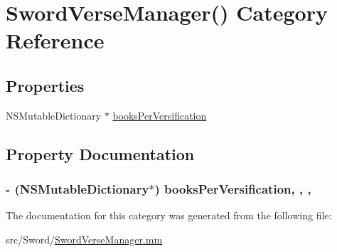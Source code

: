 \hypertarget{category_sword_verse_manager_07_08}{\section{Sword\-Verse\-Manager() Category Reference}
\label{category_sword_verse_manager_07_08}
}
\subsection*{Properties}
\begin{DoxyCompactItemize}
\item 
N\-S\-Mutable\-Dictionary $\ast$ \hyperlink{category_sword_verse_manager_07_08_a8db39dd937ba18fc1560ff8db1780b5e}{books\-Per\-Versification}
\end{DoxyCompactItemize}


\subsection{Property Documentation}
\hypertarget{category_sword_verse_manager_07_08_a8db39dd937ba18fc1560ff8db1780b5e}{
\subsubsection[{books\-Per\-Versification}]{\setlength{\rightskip}{0pt plus 5cm}-\/ (N\-S\-Mutable\-Dictionary$\ast$) books\-Per\-Versification\hspace{0.3cm}{\ttfamily [read]}, {\ttfamily [write]}, {\ttfamily [atomic]}, {\ttfamily [retain]}}}\label{category_sword_verse_manager_07_08_a8db39dd937ba18fc1560ff8db1780b5e}


The documentation for this category was generated from the following file\-:\begin{DoxyCompactItemize}
\item 
src/\-Sword/\hyperlink{_sword_verse_manager_8mm}{Sword\-Verse\-Manager.\-mm}\end{DoxyCompactItemize}
